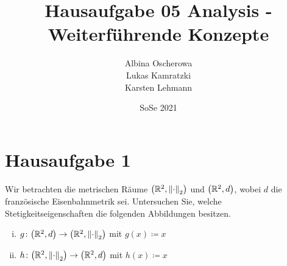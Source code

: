 \documentclass{article}
\author{Albina Oscherowa \\ Lukas Kamratzki \\ Karsten Lehmann}
\date{SoSe 2021}
\title{Hausaufgabe 05 Analysis - Weiterführende Konzepte}
\begin{document}
\section*{Hausaufgabe 1}

Wir betrachten die metrischen Räume $\qty(\mathbb{R}^2, \norm{\cdot}_2)$ und
$\qty(\mathbb{R}^2, d)$, wobei $d$ die französische Eisenbahnmetrik sei.
Untersuchen Sie, welche Stetigkeitseigenschaften die folgenden Abbildungen
besitzen.
\begin{enumerate}[(i)]
\item $g \colon \qty(\mathbb{R}^2, d) \to \qty(\mathbb{R}^2, \norm{\cdot}_2)$
  mit $g(x) \coloneqq x$
\item $h \colon \qty(\mathbb{R}^2, \norm{\cdot}_2) \to \qty(\mathbb{R}^2, d)$
  mit $h(x) \coloneqq x$
\end{enumerate}
\end{document}
